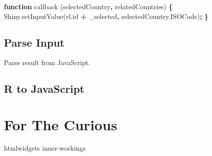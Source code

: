 \documentclass[
]{krantz}
\makeatletter
\newenvironment{Shaded}{\begin{snugshade}}{\end{snugshade}}
\newcommand{\AttributeTok}[1]{\textcolor[rgb]{0.61,0.61,0.61}{#1}}
\newcommand{\KeywordTok}[1]{\textcolor[rgb]{0.27,0.27,0.27}{\textbf{#1}}}
\newcommand{\NormalTok}[1]{#1}
\newcommand{\OperatorTok}[1]{\textcolor[rgb]{0.43,0.43,0.43}{\textbf{#1}}}
\newcommand{\StringTok}[1]{\textcolor[rgb]{0.5,0.5,0.5}{#1}}
\newcommand{\VariableTok}[1]{\textcolor[rgb]{0,0,0}{#1}}
\newenvironment{kframe}{%
\medskip{}
\setlength{\fboxsep}{.8em}
 \def\at@end@of@kframe{}%
 \ifinner\ifhmode%
  \def\at@end@of@kframe{\end{minipage}}%
  \begin{minipage}{\columnwidth}%
 \fi\fi%
 \def\FrameCommand##1{\hskip\@totalleftmargin \hskip-\fboxsep
 \colorbox{shadecolor}{##1}\hskip-\fboxsep
     \hskip-\linewidth \hskip-\@totalleftmargin \hskip\columnwidth}%
 \MakeFramed {\advance\hsize-\width
   \@totalleftmargin\z@ \linewidth\hsize
   \@setminipage}}%
 {\par\unskip\endMakeFramed%
 \at@end@of@kframe}
\renewenvironment{Shaded}{\begin{kframe}}{\end{kframe}}
\makeatother
\begin{document}
\begin{Shaded}
\begin{Highlighting}[]
\KeywordTok{function} \AttributeTok{callback}\NormalTok{ (selectedCountry}\OperatorTok{,}\NormalTok{ relatedCountries) }\OperatorTok{\{}
  \VariableTok{Shiny}\NormalTok{.}\AttributeTok{setInputValue}\NormalTok{(}\VariableTok{el}\NormalTok{.}\AttributeTok{id} \OperatorTok{+} \StringTok{\textquotesingle{}\_selected\textquotesingle{}}\OperatorTok{,} \VariableTok{selectedCountry}\NormalTok{.}\AttributeTok{ISOCode}\NormalTok{)}\OperatorTok{;}
\OperatorTok{\}}
\end{Highlighting}
\end{Shaded}

\hypertarget{parse-input}{%
\section*{Parse Input}\label{parse-input}}


Parse result from JavaScript.

\hypertarget{r-to-javascript}{%
\section*{R to JavaScript}\label{r-to-javascript}}


\hypertarget{for-the-curious}{%
\chapter{For The Curious}\label{for-the-curious}}

htmlwidgets inner-workings

  

\backmatter
\printindex
\end{document}
